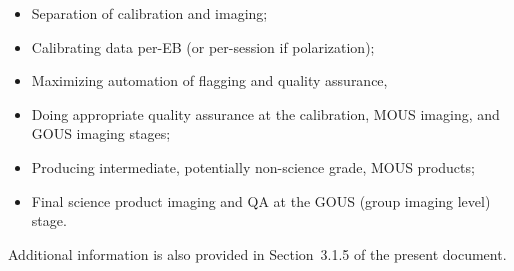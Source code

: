 \begin{itemize}[itemsep=-0.5em]
    \item Separation of calibration and imaging;
    \item Calibrating data per-EB (or per-session if polarization);
    \item Maximizing automation of flagging and quality assurance,
    \item Doing appropriate quality assurance at the calibration, MOUS imaging, and GOUS imaging stages;
    \item Producing intermediate, potentially non-science grade, MOUS products;
    \item Final science product imaging and QA at the GOUS (group imaging level) stage.
\end{itemize}

Additional information is also provided in Section~3.1.5 of the present document. 




